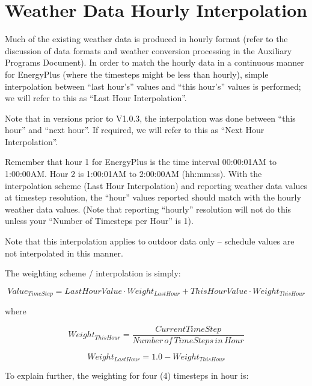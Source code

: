 \section{Weather Data Hourly Interpolation}\label{weather-data-hourly-interpolation}

Much of the existing weather data is produced in hourly format (refer to the discussion of data formats and weather conversion processing in the Auxiliary Programs Document). In order to match the hourly data in a continuous manner for EnergyPlus (where the timesteps might be less than hourly), simple interpolation between ``last hour's'' values and ``this hour's'' values is performed; we will refer to this as ``Last Hour Interpolation''.

Note that in versions prior to V1.0.3, the interpolation was done between ``this hour'' and ``next hour''. If required, we will refer to this as ``Next Hour Interpolation''.

Remember that hour 1 for EnergyPlus is the time interval 00:00:01AM to 1:00:00AM. Hour 2 is 1:00:01AM to 2:00:00AM (hh:mm:ss). With the interpolation scheme (Last Hour Interpolation) and reporting weather data values at timestep resolution, the ``hour'' values reported should match with the hourly weather data values. (Note that reporting ``hourly'' resolution will not do this unless your ``Number of Timesteps per Hour'' is 1).

Note that this interpolation applies to outdoor data only -- schedule values are not interpolated in this manner.

The weighting scheme / interpolation is simply:

\begin{equation}
Valu{e_{TimeStep}} = LastHourValue\cdot Weigh{t_{LastHour}} + ThisHourValue\cdot Weigh{t_{ThisHour}}
\end{equation}

where

\begin{equation}
Weigh{t_{ThisHour}} = \frac{{CurrentTimeStep}}{{Number\,of\,TimeSteps\,in\,Hour}}
\end{equation}

\begin{equation}
Weigh{t_{LastHour}} = 1.0 - Weigh{t_{ThisHour}}
\end{equation}

To explain further, the weighting for four (4) timesteps in hour is:

